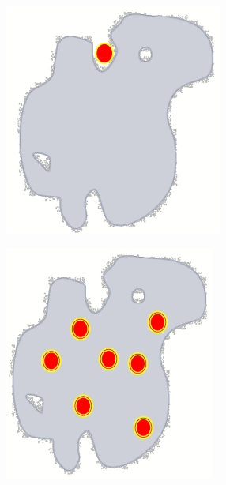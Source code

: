 \documentclass[]{article}
\begin{document}
\begin{figure}[H]
	\caption{Outside-in Model}\label{fig:outside:in}
	\begin{subfigure}[b]{0.45\textwidth}
		\caption{ }\label{fig:outside:in1}
		\includegraphics[width=\textwidth]{OutsideIn1}
	\end{subfigure}
	\begin{subfigure}[b]{0.45\textwidth}
		\caption{ }\label{fig:outside:in2}
		\includegraphics[width=\textwidth]{OutsideIn2}

\end{subfigure}
\end{figure}
\end{document}

